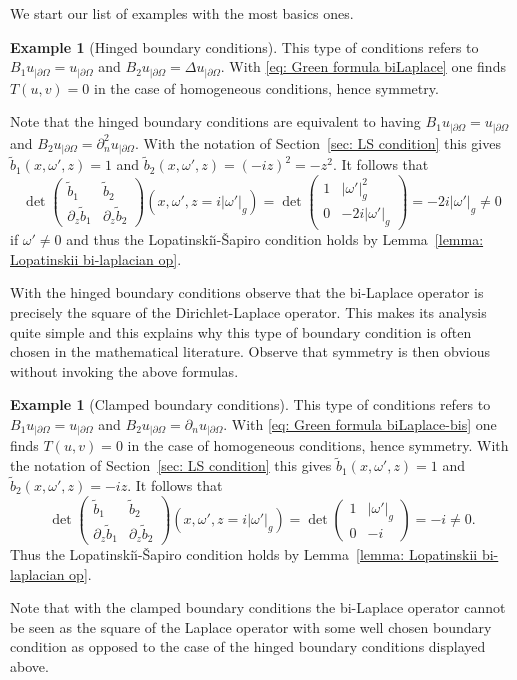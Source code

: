 \documentclass[JEP,XML,SOM,Unicode,published]{cedram}
\theoremstyle{plain}
\theoremstyle{definition}
\newtheorem{example}[theorem]{Example}
\newcommand{\LS}{Lopatinski\u{\i}-\v{S}apiro\xspace}
\newcommand{\bd}{\ensuremath{_{|\partial\Omega}}}
\begin{document}
We start our list of examples with the most basics ones.

\begin{example}[Hinged boundary conditions]
\label{ex: hinged boundary conditions}
This type of conditions refers to $B_1 u\bd = u\bd$ and $B_2 u\bd
= \Delta u\bd$. With \eqref{eq: Green formula biLaplace} one finds
$T(u,v) =0$ in the case of homogeneous conditions, hence symmetry.

Note that the hinged boundary conditions are equivalent to having
$B_1 u\bd = u\bd$ and $B_2 u\bd
= \partial_n^2 u\bd$.
With the notation of Section~\ref{sec: LS condition} this gives
$\tilde{b}_1(x,\omega',z)=1$ and $\tilde{b}_2(x,\omega',z)=(-iz)^2 =
-z^2$. It follows that
\begin{equation*}
\det
\begin{pmatrix}
\tilde{b}_1 &\tilde{b}_2 \\[
2pt]
\partial_z\tilde{b}_1& \partial_z\tilde{b}_2
\end{pmatrix} (x,\omega',z=i|\omega'|_g)
=
\det
\begin{pmatrix}
1 &|\omega'|^2_g \\[
2pt]
0&-2i|\omega'|_g
\end{pmatrix} =-2i|\omega'|_g \neq 0
\end{equation*}
if $\omega'\neq 0$ and thus the \LS condition holds by Lemma~\ref{lemma: Lopatinskii bi-laplacian op}.

With the hinged boundary conditions observe that the bi-Laplace operator is precisely
the square of the Dirichlet-Laplace operator. This makes its analysis
quite simple and this explains why this type of boundary condition is
often chosen in the mathematical literature. Observe that symmetry is
then obvious without invoking the above formulas.
\end{example}

\begin{example}[Clamped boundary conditions]
This type of conditions refers to $B_1 u\bd = u\bd$ and $B_2 u\bd
= \partial_n u\bd$. With \eqref{eq: Green formula biLaplace-bis} one finds
$T(u,v) =0$ in the case of homogeneous conditions, hence symmetry.
With the notation of Section~\ref{sec: LS condition} this gives
$\tilde{b}_1(x,\omega',z)=1$ and $\tilde{b}_2(x,\omega',z)=-iz$. It follows that
\begin{equation*}
\det
\begin{pmatrix}
\tilde{b}_1 &\tilde{b}_2 \\[
2pt]
\partial_z\tilde{b}_1& \partial_z\tilde{b}_2
\end{pmatrix} (x,\omega',z=i|\omega'|_g)
=
\det
\begin{pmatrix}
1 &|\omega'|_g \\[
2pt]
0&-i
\end{pmatrix} =-i \neq 0.
\end{equation*}
Thus the \LS condition holds by Lemma~\ref{lemma: Lopatinskii bi-laplacian op}.

Note that with the clamped boundary conditions the bi-Laplace operator
cannot be seen as the square
of the Laplace operator with some well chosen boundary condition as
opposed to the case of the hinged boundary conditions displayed
above.
\end{example}
\end{document}
